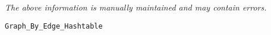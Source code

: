 \label{pkg:graph\_by\_edge\_hashtable}

{\tiny \it The above information is manually maintained and may contain errors.}
\begin{verbatim}
Graph_By_Edge_Hashtable
\end{verbatim}
